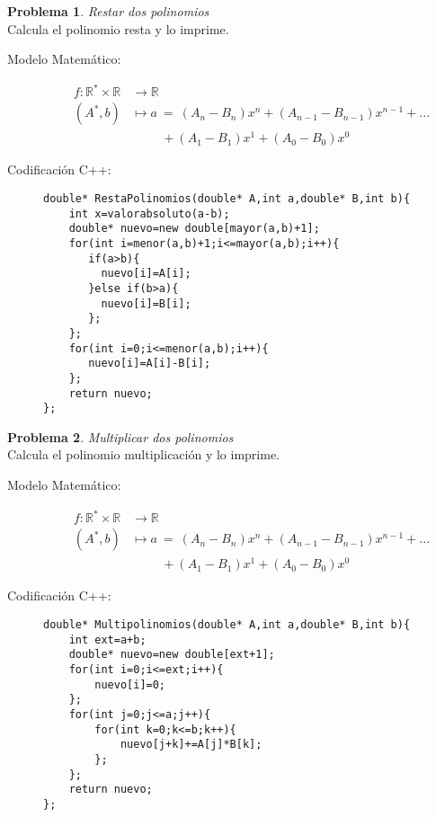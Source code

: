 \documentclass{article}
\theoremstyle{plain}
\theoremstyle{definition}
\newtheorem{problem}{Problema}
\begin{document}
\begin{problem} \emph{Restar dos polinomios}\\
Calcula el polinomio resta y lo imprime.
%
\begin{description}
\item[Modelo Matemático:]
%
\begin{align*}
f: \mathbb{R}^*\times\mathbb{R}&\to \mathbb{R}\\
(A^*,b) &\mapsto a\ =\ (A_n-B_n) x^n + (A_{n-1}-B_{n-1}) x^{n-1} + ... \\& \hspace{1cm}+ (A_1-B_1) x^1 + (A_0-B_0) x^0
\end{align*}
%
\item[Codificación \textsf{C++}:]\hfill
%
\begin{verbatim}
double* RestaPolinomios(double* A,int a,double* B,int b){
    int x=valorabsoluto(a-b);
    double* nuevo=new double[mayor(a,b)+1];
    for(int i=menor(a,b)+1;i<=mayor(a,b);i++){
       if(a>b){
       	 nuevo[i]=A[i];
	   }else if(b>a){
	   	 nuevo[i]=B[i];
	   };
	};
	for(int i=0;i<=menor(a,b);i++){
       nuevo[i]=A[i]-B[i];
	};
    return nuevo;
};
\end{verbatim}
\end{description}
\end{problem}
\begin{problem} \emph{Multiplicar dos polinomios}\\
Calcula el polinomio multiplicación y lo imprime.
%
\begin{description}
\item[Modelo Matemático:]
%
\begin{align*}
f: \mathbb{R}^*\times\mathbb{R}&\to \mathbb{R}\\
(A^*,b) &\mapsto a\ =\ (A_n-B_n) x^n + (A_{n-1}-B_{n-1}) x^{n-1} + ... \\& \hspace{1cm}+ (A_1-B_1) x^1 + (A_0-B_0) x^0
\end{align*}
%
\item[Codificación \textsf{C++}:]\hfill
%
\begin{verbatim}
double* Multipolinomios(double* A,int a,double* B,int b){
    int ext=a+b; 
    double* nuevo=new double[ext+1];
    for(int i=0;i<=ext;i++){
        nuevo[i]=0;
    };
    for(int j=0;j<=a;j++){
        for(int k=0;k<=b;k++){
            nuevo[j+k]+=A[j]*B[k];
        };
    };
    return nuevo;
};
\end{verbatim}
\end{description}
\end{problem}
\end{document}
